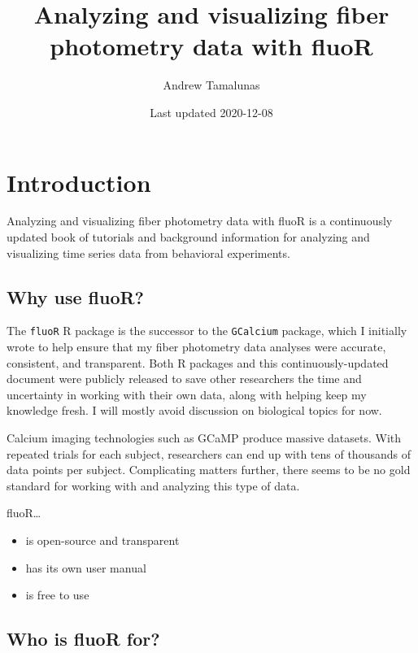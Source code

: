 \documentclass[
]{book}
\title{Analyzing and visualizing fiber photometry data with fluoR}
\author{Andrew Tamalunas}
\date{Last updated 2020-12-08}
\providecommand{\tightlist}{%
  \setlength{\itemsep}{0pt}\setlength{\parskip}{0pt}}
\begin{document}
\maketitle

{
\setcounter{tocdepth}{1}
\tableofcontents
}
\hypertarget{index}{%
\chapter{Introduction}\label{index}}

Analyzing and visualizing fiber photometry data with fluoR is a continuously updated book of tutorials and background information for analyzing and visualizing time series data from behavioral experiments.

\hypertarget{index-whyfluor}{%
\section{Why use fluoR?}\label{index-whyfluor}}

The \texttt{fluoR} R package is the successor to the \texttt{GCalcium} package, which I initially wrote to help ensure that my fiber photometry data analyses were accurate, consistent, and transparent. Both R packages and this continuously-updated document were publicly released to save other researchers the time and uncertainty in working with their own data, along with helping keep my knowledge fresh. I will mostly avoid discussion on biological topics for now.

Calcium imaging technologies such as GCaMP produce massive datasets. With repeated trials for each subject, researchers can end up with tens of thousands of data points per subject. Complicating matters further, there seems to be no gold standard for working with and analyzing this type of data.

fluoR\ldots{}

\begin{itemize}
\tightlist
\item
  is open-source and transparent
\item
  has its own user manual
\item
  is free to use
\end{itemize}

\hypertarget{index-whofluorfor}{%
\section{Who is fluoR for?}\label{index-whofluorfor}}
\end{document}
